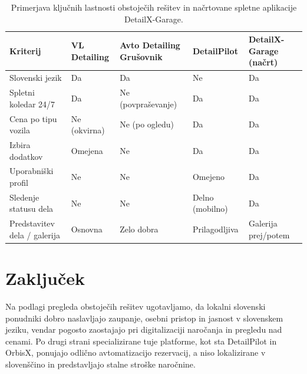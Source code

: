 \documentclass[11pt,a4paper]{article}
\begin{document}
\begin{table}[H]
  \centering
  \small
  \begin{tabular}{>{\raggedright\arraybackslash}p{2.6cm}
                  >{\raggedright\arraybackslash}p{2.2cm}
                  >{\raggedright\arraybackslash}p{2.2cm}
                  >{\raggedright\arraybackslash}p{2.2cm}
                  >{\raggedright\arraybackslash}p{2.2cm}}
    \toprule
    \textbf{Kriterij} & \textbf{VL Detailing} & \textbf{Avto Detailing Grušovnik} & \textbf{DetailPilot} & \textbf{DetailX-Garage (načrt)} \\
    \midrule
    Slovenski jezik            & Da            & Da                  & Ne              & Da \\
    Spletni koledar 24/7       & Da            & Ne (povpraševanje)  & Da              & Da \\
    Cena po tipu vozila        & Ne (okvirna)  & Ne (po ogledu)      & Da              & Da \\
    Izbira dodatkov            & Omejena       & Ne                  & Da              & Da \\
    Uporabniški profil         & Ne            & Ne                  & Omejeno         & Da \\
    Sledenje statusu dela      & Ne            & Ne                  & Delno (mobilno) & Da \\
    Predstavitev dela / galerija & Osnovna     & Zelo dobra          & Prilagodljiva   & Galerija prej/potem \\
    \bottomrule
  \end{tabular}
  \caption{Primerjava ključnih lastnosti obstoječih rešitev in načrtovane spletne aplikacije DetailX-Garage.}
  \label{tab:primerjava}
\end{table}

\section{Zaključek}

Na podlagi pregleda obstoječih rešitev ugotavljamo, da lokalni slovenski ponudniki dobro naslavljajo zaupanje, osebni pristop in jasnost v slovenskem jeziku, vendar pogosto zaostajajo pri digitalizaciji naročanja in pregledu nad cenami. Po drugi strani specializirane tuje platforme, kot sta DetailPilot in OrbisX, ponujajo odlično avtomatizacijo rezervacij, a niso lokalizirane v slovenščino in predstavljajo stalne stroške naročnine.
\end{document}

